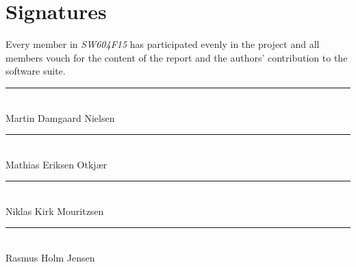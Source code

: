 
\chapter*{Signatures}
Every member in \emph{SW604F15} has participated evenly in the project and all members vouch for the content of the report and the authors' contribution to the \giraf software suite.

\vspace{1cm}

\vspace*{\fill}


\noindent
\rule{9cm}{1pt}				\\
\vspace{1.5cm}
Martin Damgaard Nielsen		\\


\noindent
\rule{9cm}{1pt}				\\
\vspace{1.5cm}
Mathias Eriksen Otkjær	    \\


\noindent
\rule{9cm}{1pt}				\\
\vspace{1.5cm}
Niklas Kirk Mouritzsen		\\


\noindent
\rule{9cm}{1pt}				\\
\vspace{1.5cm}
Rasmus Holm Jensen			\\

\vspace*{\fill}